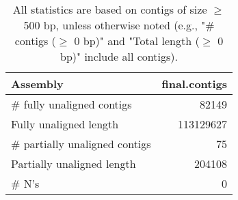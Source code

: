 \documentclass[12pt,a4paper]{article}
\begin{document}
\begin{table}[ht]
\begin{center}
\caption{All statistics are based on contigs of size $\geq$ 500 bp, unless otherwise noted (e.g., "\# contigs ($\geq$ 0 bp)" and "Total length ($\geq$ 0 bp)" include all contigs).}
\begin{tabular}{|l*{1}{|r}|}
\hline
Assembly & final.contigs \\ \hline
\# fully unaligned contigs & 82149 \\ \hline
Fully unaligned length & 113129627 \\ \hline
\# partially unaligned contigs & 75 \\ \hline
Partially unaligned length & 204108 \\ \hline
\# N's & 0 \\ \hline
\end{tabular}
\end{center}
\end{table}
\end{document}
